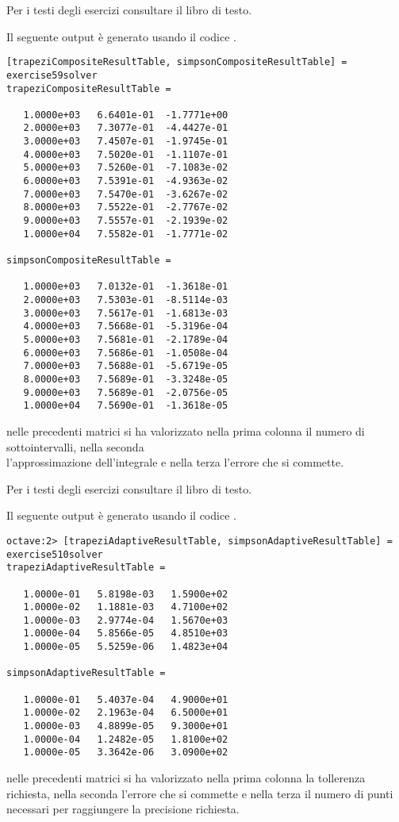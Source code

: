 \begin{exercise} 
Per i testi degli esercizi consultare il libro di testo.
\end{exercise}
Il seguente output \`e generato usando il codice
.
\begin{lstlisting}
[trapeziCompositeResultTable, simpsonCompositeResultTable] = exercise59solver
trapeziCompositeResultTable =

   1.0000e+03   6.6401e-01  -1.7771e+00
   2.0000e+03   7.3077e-01  -4.4427e-01
   3.0000e+03   7.4507e-01  -1.9745e-01
   4.0000e+03   7.5020e-01  -1.1107e-01
   5.0000e+03   7.5260e-01  -7.1083e-02
   6.0000e+03   7.5391e-01  -4.9363e-02
   7.0000e+03   7.5470e-01  -3.6267e-02
   8.0000e+03   7.5522e-01  -2.7767e-02
   9.0000e+03   7.5557e-01  -2.1939e-02
   1.0000e+04   7.5582e-01  -1.7771e-02

simpsonCompositeResultTable =

   1.0000e+03   7.0132e-01  -1.3618e-01
   2.0000e+03   7.5303e-01  -8.5114e-03
   3.0000e+03   7.5617e-01  -1.6813e-03
   4.0000e+03   7.5668e-01  -5.3196e-04
   5.0000e+03   7.5681e-01  -2.1789e-04
   6.0000e+03   7.5686e-01  -1.0508e-04
   7.0000e+03   7.5688e-01  -5.6719e-05
   8.0000e+03   7.5689e-01  -3.3248e-05
   9.0000e+03   7.5689e-01  -2.0756e-05
   1.0000e+04   7.5690e-01  -1.3618e-05
\end{lstlisting}
nelle precedenti matrici si ha valorizzato nella prima colonna il numero di
sottointervalli, nella seconda \\
l'approssimazione dell'integrale e nella terza l'errore che si commette.

\begin{exercise} 
Per i testi degli esercizi consultare il libro di testo.
\end{exercise}
Il seguente output \`e generato usando il codice
.
\begin{lstlisting}
octave:2> [trapeziAdaptiveResultTable, simpsonAdaptiveResultTable] = exercise510solver
trapeziAdaptiveResultTable =

   1.0000e-01   5.8198e-03   1.5900e+02
   1.0000e-02   1.1881e-03   4.7100e+02
   1.0000e-03   2.9774e-04   1.5670e+03
   1.0000e-04   5.8566e-05   4.8510e+03
   1.0000e-05   5.5259e-06   1.4823e+04

simpsonAdaptiveResultTable =

   1.0000e-01   5.4037e-04   4.9000e+01
   1.0000e-02   2.1963e-04   6.5000e+01
   1.0000e-03   4.8899e-05   9.3000e+01
   1.0000e-04   1.2482e-05   1.8100e+02
   1.0000e-05   3.3642e-06   3.0900e+02
\end{lstlisting}
nelle precedenti matrici si ha valorizzato nella prima colonna la tollerenza
richiesta, nella seconda l'errore che si commette e nella terza il numero di
punti necessari per raggiungere la precisione richiesta.

